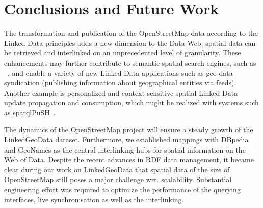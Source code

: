 \section{Conclusions and Future Work}
\label{sec:conclusions}

The transformation and publication of the OpenStreetMap data according to the
Linked Data principles adds a new dimension to the Data Web: spatial data can
be retrieved and interlinked on an unprecedented level of granularity. These
enhancements may further contribute to semantic-spatial search engines, such as
~\cite{sim_ir, spirit}, and enable a variety of new Linked Data applications such
as geo-data syndication (publishing information about geographical entities via
feeds). Another example is personalized and context-sensitive
spatial Linked Data update propagation and consumption, which might be
realized with systems such as sparqlPuSH~\cite{sparql_push}.
 

The dynamics of the OpenStreetMap project will
ensure a steady growth of the LinkedGeoData dataset. Furthermore, we established mappings with DBpedia and GeoNames as the central interlinking hubs for spatial information on the Web of Data.
Despite the recent advances in RDF data management, it became clear during our work on LinkedGeoData that spatial data of the size of OpenStreetMap still poses a major challenge wrt. scalability.
Substantial engineering effort was required to optimize the performance of the querying interfaces, live synchronisation as well as the interlinking.

